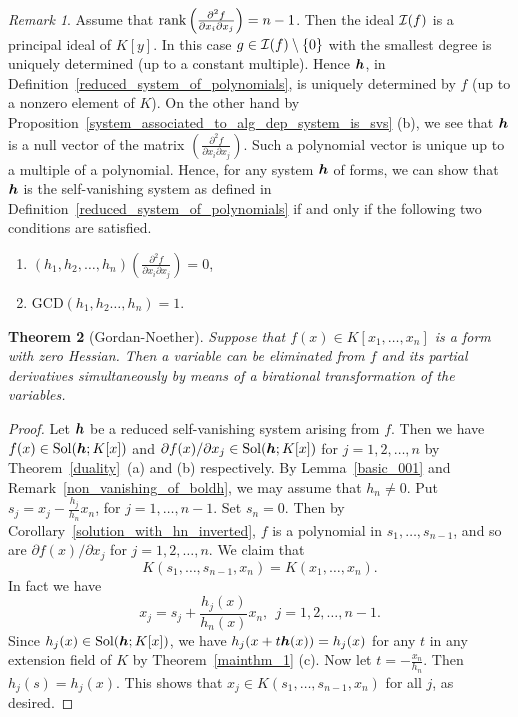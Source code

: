 \documentclass[12pt]{article}
\newtheorem{theorem}{Theorem}[section]
\theoremstyle{definition}
\theoremstyle{remark}
\newtheorem{remark}[theorem]{Remark}
\def\rank{{\rm rank}}
\def\cI{{\cal I}}
\def\sol{{\rm Sol}}
\def\boldh{\mbox{\boldmath $h$}}
\def\pa{\partial}
\begin{document}
\begin{remark} \label{uniqueness_of_g_and_h}  %
Assume that $\rank \left(\frac{\pa ^2 f}{\pa x_i \pa x_j}\right) =n-1$. Then 
the ideal $\cI(f)$ is a principal ideal of $K[y]$.    In this case 
$g \in \cI(f) \setminus \{0\}$ with the smallest degree is uniquely determined (up to a constant multiple). 
Hence $\boldh$, in Definition~\ref{reduced_system_of_polynomials}, is uniquely determined by $f$
(up to a nonzero element of $K$).  
On the other hand by Proposition~\ref{system_associated_to_alg_dep_system_is_svs} (b), we see that  
 $\boldh$ is a null vector of  the matrix  $\left(\frac{\pa ^2 f}{\pa x_i \pa x_j}\right)$.     
 Such a polynomial vector is unique up to a multiple of a polynomial.   
 Hence, for any system $\boldh$ of forms, we can show that $\boldh$ is the self-vanishing system as defined in
 Definition~\ref{reduced_system_of_polynomials} if and only if 
the following two conditions are satisfied. 
\begin{enumerate}
\item[\upshape(1)]
$(h_1, h_2, \ldots,  h_n) \left(\frac{\pa ^2 f}{\pa x_i \pa x_j}\right)  =0$,
\item[\upshape(2)]
$\text{GCD}(h_1, h_2 \ldots, h_n)=1$.
\end{enumerate}
\end{remark}


\begin{theorem}[Gordan-Noether]  \label{1st_main_th_of_gordan_noether}%
Suppose that $f(x) \in K[x_1, \ldots, x_n]$ is a form with zero Hessian. 
Then a variable can be eliminated from $f$ and its partial derivatives 
simultaneously by means of a birational transformation of the variables.
\end{theorem}

\begin{proof}
Let $\boldh$ be a reduced self-vanishing system arising from  $f$.  
Then we have  $f(x) \in \sol(\boldh; K[x])$ 
and $\pa f(x)/\pa x_j \in \sol(\boldh; K[x])$ for $j = 1,2,\ldots,n$ 
by Theorem~\ref{duality}~(a) and (b) respectively.
By Lemma~\ref{basic_001} and Remark~\ref{non_vanishing_of_boldh}, we may assume that $h_n \neq 0$.  
Put $s_j=x_j - \frac{h_j}{h_n}x_n$, for $j=1, \ldots, n-1$. Set $s_n=0$.   Then by    
Corollary~\ref{solution_with_hn_inverted},  $f$ is a polynomial in $s_1, \ldots, s_{n-1}$,
and so are $\pa f(x)/\pa x_j$ for $j = 1,2,\ldots,n$.
  We claim that 
\[K(s_1,\ldots, s_{n-1}, x_n)=K(x_1, \ldots, x_n).\]
In fact we have  
\[x_j=s_j + \frac{h_j(x)}{h_n(x)}x_n, \ \ j=1,2, \ldots, n-1.\] 
Since $h_{j}(x) \in \sol(\boldh;K[x])$,  we have $h_j(x+t\boldh(x))=h_j(x)$ for any 
$t$ in any extension field of $K$ by Theorem~\ref{mainthm_1} (c).    
Now let  $t=-\frac{x_n}{h_n}$. Then $h_j(s)=h_j(x)$. 
This shows that $x_j\in K(s_1, \ldots, s_{n-1},x_n)$ for all $j$, as desired.  
\end{proof}
\end{document}
